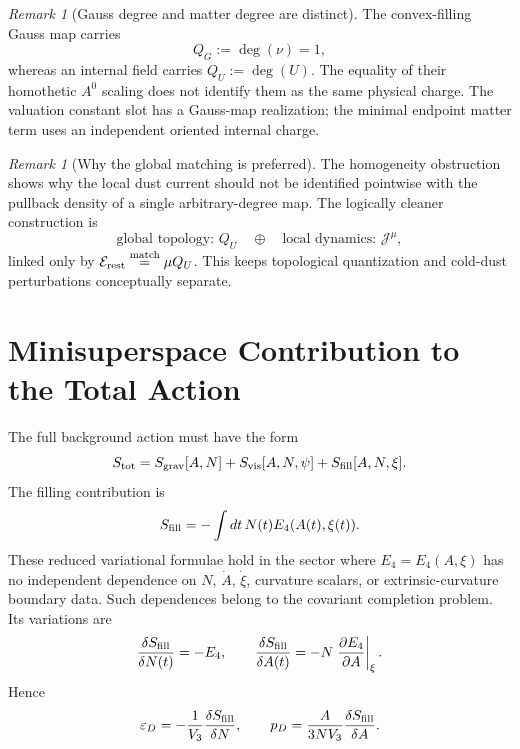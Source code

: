 \documentclass[11pt,a4paper]{article}
\def\dd{d}%
\def\QU{Q_U}%
\def\QG{Q_G}%
\numberwithin{equation}{section}
\theoremstyle{definition}
\theoremstyle{plain}
\theoremstyle{remark}
\newtheorem{remark}[criterion]{Remark}
\newcommand{\Efour}{E_4}
\newcommand{\epsD}{\varepsilon_D}
\newcommand{\pD}{p_D}
\newcommand{\dd}{\mathrm{d}}
\newcommand{\QG}{Q_{\rm G}}
\newcommand{\QU}{Q_U}
\begin{document}
\begin{remark}[Gauss degree and matter degree are distinct]
The convex-filling Gauss map carries
\begin{equation}
\QG:=\deg(\nu)=1,
\end{equation}
whereas an internal field carries \(\QU:=\deg(U)\). The equality of their homothetic \(A^0\) scaling does not identify them as the same physical charge. The valuation constant slot has a Gauss-map realization; the minimal endpoint matter term uses an independent oriented internal charge.
\end{remark}

\begin{remark}[Why the global matching is preferred]
The homogeneity obstruction shows why the local dust current should not be identified pointwise with the pullback density of a single arbitrary-degree map. The logically cleaner construction is
\begin{equation}
\text{global topology: }\QU
\quad\oplus\quad
\text{local dynamics: }\mathcal J^\mu,
\end{equation}
linked only by \(\mathcal E_{\rm rest}\overset{\rm match}{=}\mu\QU\). This keeps topological quantization and cold-dust perturbations conceptually separate.
\end{remark}

\section{Minisuperspace Contribution to the Total Action}
The full background action must have the form
\begin{equation}
S_{\rm tot}=S_{\rm grav}[A,N]+S_{\rm vis}[A,N,\psi]+S_{\rm fill}[A,N,\xi].
\end{equation}
The filling contribution is
\begin{equation}
S_{\rm fill}=-\int \dd t\,N(t)\Efour(A(t),\xi(t)).
\end{equation}
These reduced variational formulae hold in the sector where \(\Efour=\Efour(A,\xi)\) has no independent dependence on \(N\), \(\dot A\), \(\dot\xi\), curvature scalars, or extrinsic-curvature boundary data. Such dependences belong to the covariant completion problem.
Its variations are
\begin{equation}
\frac{\delta S_{\rm fill}}{\delta N(t)}=-\Efour,
\qquad
\frac{\delta S_{\rm fill}}{\delta A(t)}=-N\left.\frac{\partial\Efour}{\partial A}\right|_{\xi}.
\end{equation}
Hence
\begin{equation}
\epsD=-\frac{1}{V_3}\frac{\delta S_{\rm fill}}{\delta N},
\qquad
\pD=\frac{A}{3NV_3}\frac{\delta S_{\rm fill}}{\delta A}.
\end{equation}
\end{document}

